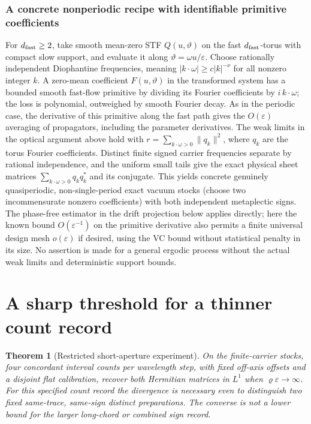 \documentclass[11pt]{article}
\newtheorem{theorem}{Theorem}
\begin{document}
\subsubsection{A concrete nonperiodic recipe with identifiable primitive coefficients}\label{a-concrete-nonperiodic-recipe-with-identifiable-primitive-coefficients}

For \(d_{\rm fast}\ge2\), take smooth mean-zero STF \(Q(u,\vartheta)\) on the fast \(d_{\rm fast}\)-torus with compact slow support, and evaluate it along \(\vartheta=\omega u/\varepsilon\). Choose rationally independent Diophantine frequencies, meaning \(|k\cdot\omega|\ge c |k|^{-\nu}\) for all nonzero integer \(k\). A zero-mean coefficient \(F(u,\vartheta)\) in the transformed system has a bounded smooth fast-flow primitive by dividing its Fourier coefficients by \(i\,k\cdot\omega\); the loss is polynomial, outweighed by smooth Fourier decay. As in the periodic case, the derivative of this primitive along the fast path gives the \(O(\varepsilon)\) averaging of propagators, including the parameter derivatives. The weak limits in the optical argument above hold with \(r=\sum_{k\cdot\omega>0}\|q_k\|^2\), where \(q_k\) are the torus Fourier coefficients. Distinct finite signed carrier frequencies separate by rational independence, and the uniform small tails give the exact physical sheet matrices \(\sum_{k\cdot\omega>0}q_kq_k^*\) and its conjugate. This yields concrete genuinely quasiperiodic, non-single-period exact vacuum stocks (choose two incommensurate nonzero coefficients) with both independent metaplectic signs. The phase-free estimator in the drift projection below applies directly; here the known bound \(O(\varepsilon^{-1})\) on the primitive derivative also permits a finite universal design mesh \(o(\varepsilon)\) if desired, using the VC bound without statistical penalty in its size. No assertion is made for a general ergodic process without the actual weak limits and deterministic support bounds.



\section{A sharp threshold for a thinner count record}\label{sec:thin}
\begin{theorem}[Restricted short-aperture experiment]\label{thm:thin}
On the finite-carrier stocks, four concordant interval counts per
wavelength step, with fixed off-axis offsets and a disjoint flat
calibration, recover both Hermitian matrices in \(L^1\) when
\(\varrho\varepsilon\to\infty\). For this specified count record
the divergence is necessary even to distinguish two fixed
same-trace, same-sign distinct preparations. The converse is not a
lower bound for the larger long-chord or combined sign record.
\end{theorem}
\end{document}
